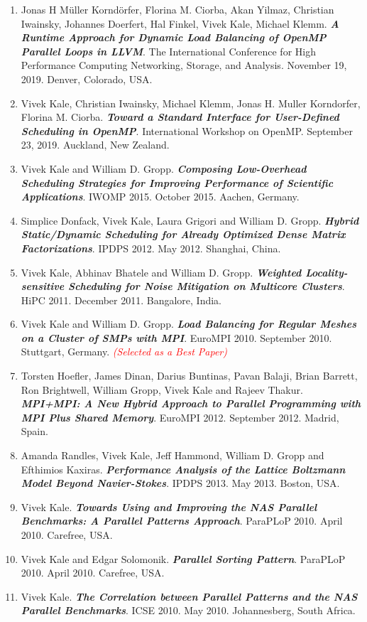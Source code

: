 \begin{enumerate}
\item Jonas H Müller Korndörfer, Florina M. Ciorba, Akan Yilmaz, Christian Iwainsky, Johannes Doerfert, Hal Finkel, Vivek Kale, Michael Klemm. \textbf{\textit{A Runtime Approach for Dynamic Load Balancing of OpenMP Parallel Loops in LLVM}}. The International Conference for High Performance Computing Networking, Storage, and Analysis. November 19, 2019. Denver, Colorado, USA.

\item Vivek Kale, Christian Iwainsky, Michael Klemm, Jonas H. Muller Korndorfer, Florina M. Ciorba. \textbf{\textit{Toward a Standard Interface for User-Defined Scheduling in OpenMP}}. International Workshop on OpenMP. September 23, 2019. Auckland, New Zealand. 
\item Vivek Kale and William D. Gropp. \textbf{\textit{Composing Low-Overhead Scheduling Strategies for Improving Performance of Scientific Applications}}. IWOMP 2015. October 2015. Aachen, Germany.
\item Simplice Donfack, Vivek Kale, Laura Grigori and William D. Gropp. \textbf{\textit{Hybrid Static/Dynamic Scheduling for Already Optimized Dense Matrix Factorizations}}. IPDPS 2012. May 2012. Shanghai, China.
\item Vivek Kale, Abhinav Bhatele and William D. Gropp. \textbf{\textit{Weighted Locality-sensitive Scheduling for
      Noise Mitigation on Multicore Clusters}}. HiPC 2011. December
  2011. Bangalore, India. 
\item Vivek Kale and William D. Gropp. \textbf{\textit{Load Balancing for Regular Meshes on a Cluster of SMPs with MPI}}. EuroMPI 2010. September 2010. Stuttgart, Germany. \textit{\textcolor{red}{(Selected as a Best Paper)}}
\item Torsten Hoefler, James Dinan, Darius Buntinas, Pavan Balaji, Brian Barrett, Ron Brightwell, William Gropp, Vivek Kale and Rajeev Thakur. \textbf{\textit{MPI+MPI: A New Hybrid Approach to Parallel Programming with MPI Plus Shared Memory}}. EuroMPI 2012. September 2012. Madrid, Spain.
\item Amanda Randles, Vivek Kale, Jeff Hammond, William D. Gropp and Efthimios Kaxiras. \textbf{\textit{Performance Analysis of the Lattice
Boltzmann Model Beyond Navier-Stokes}}. IPDPS 2013. May 2013. Boston, USA.
\item Vivek Kale. \textbf{\textit{Towards Using and Improving the NAS Parallel Benchmarks: A Parallel Patterns Approach}}. ParaPLoP 2010. April 2010. Carefree, USA.
\item Vivek Kale and Edgar Solomonik. \textbf{\textit{Parallel Sorting Pattern}}. ParaPLoP 2010. April 2010. Carefree, USA. 
\item Vivek Kale. \textbf{\textit{The Correlation between Parallel Patterns and the NAS Parallel Benchmarks}}. ICSE 2010. May 2010. Johannesberg, South Africa.
\end{enumerate} 

